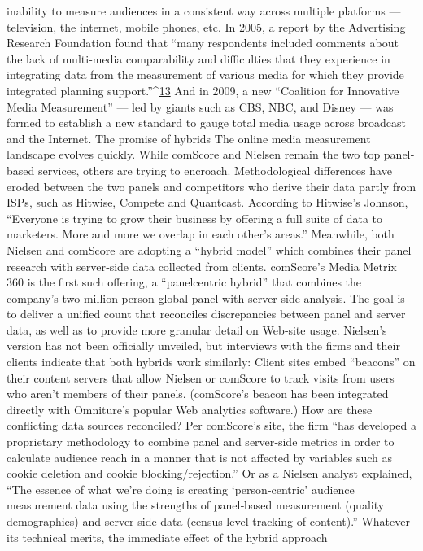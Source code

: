 inability to measure audiences in a consistent way across multiple
platforms — television, the internet, mobile phones, etc. In 2005, a report
by the Advertising Research Foundation found that ``many respondents
included comments about the lack of multi‐media comparability and
difficulties that they experience in integrating data from the measurement
of various media for which they provide integrated planning support.''^{\href{#endnotes}{13}}
And in 2009, a new ``Coalition for Innovative Media Measurement'' — led
by giants such as CBS, NBC, and Disney — was formed to establish a new
standard to gauge total media usage across broadcast and the Internet.
The promise of hybrids
The online media measurement landscape evolves quickly. While
comScore and Nielsen remain the two top panel‐based services, others are
trying to encroach. Methodological differences have eroded between the
two panels and competitors who derive their data partly from ISPs, such
as Hitwise, Compete and Quantcast. According to Hitwise’s Johnson,
``Everyone is trying to grow their business by offering a full suite of data
to marketers. More and more we overlap in each other’s areas.''
Meanwhile, both Nielsen and comScore are adopting a ``hybrid model''
which combines their panel research with server‐side data collected from
clients. comScore’s Media Metrix 360 is the first such offering, a ``panelcentric
hybrid'' that combines the company’s two million person global
panel with server‐side analysis. The goal is to deliver a unified count that
reconciles discrepancies between panel and server data, as well as to
provide more granular detail on Web‐site usage.
Nielsen’s version has not been officially unveiled, but interviews with the
firms and their clients indicate that both hybrids work similarly: Client
sites embed ``beacons'' on their content servers that allow Nielsen or
comScore to track visits from users who aren’t members of their panels.
(comScore’s beacon has been integrated directly with Omniture’s popular
Web analytics software.)
How are these conflicting data sources reconciled? Per comScore’s site, the
firm ``has developed a proprietary methodology to combine panel and
server‐side metrics in order to calculate audience reach in a manner that is
not affected by variables such as cookie deletion and cookie
blocking/rejection.'' Or as a Nielsen analyst explained, ``The essence of
what we’re doing is creating ‘person‐centric’ audience measurement data
using the strengths of panel‐based measurement (quality demographics)
and server‐side data (census‐level tracking of content).''
Whatever its technical merits, the immediate effect of the hybrid approach
